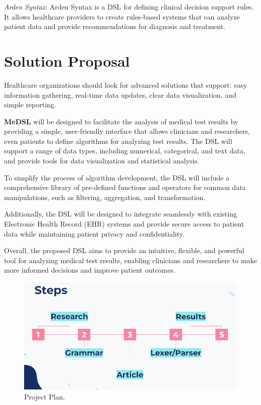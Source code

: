 \emph{Arden Syntax}: Arden Syntax is a DSL for defining clinical decision support rules. It allows healthcare providers to create rules-based systems that can analyze patient data and provide recommendations for diagnosis and treatment.

\vspace{0.5cm}
\section{Solution Proposal}
Healthcare organizations should look for advanced solutions that support: easy information gathering, real-time data updates, clear data visualization, and simple reporting.

\textbf{MeDSL} will be designed to facilitate the analysis of medical test results by providing a simple, user-friendly interface that allows clinicians and researchers, even patients to define algorithms for analyzing test results. 
The DSL will support a range of data types, including numerical, categorical, and text data, and provide tools for data visualization and statistical analysis.

To simplify the process of algorithm development, the DSL will include a comprehensive library of pre-defined functions and operators for common data manipulations, such as filtering, aggregation, and transformation.

Additionally, the DSL will be designed to integrate seamlessly with existing Electronic Health Record (EHR) systems and provide secure access to patient data while maintaining patient privacy and confidentiality.

Overall, the proposed DSL aims to provide an intuitive, flexible, and powerful tool for analyzing medical test results, enabling clinicians and researchers to make more informed decisions and improve patient outcomes.



\begin{figure}[H]
  \centering
  \includegraphics[width=\textwidth]{images/plan.png}
  \caption{Project Plan.}
  \label{fig:project_plan}
\end{figure}

